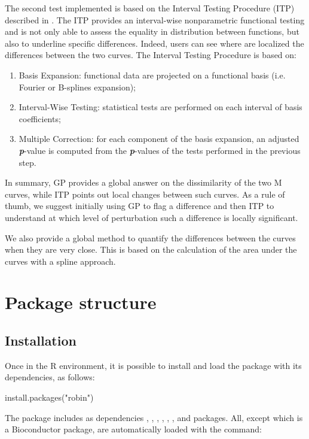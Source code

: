 The second test implemented is based on the Interval Testing Procedure (ITP) described in \cite{PiniVantini:2016}.
The ITP provides an interval-wise nonparametric functional testing and is not only able to assess the equality in distribution between functions, but also to underline specific differences. 
Indeed, users can see where are localized the differences between the two curves.
The Interval Testing Procedure is based on: 
\begin{enumerate}
\item Basis Expansion: functional data are projected on a functional basis (i.e. Fourier or B-splines expansion);
\item Interval-Wise Testing: statistical tests are performed on each interval of basis coefficients;
\item Multiple Correction: for each component of the basis expansion, an adjusted \textbf{\emph{p}}-value is computed from the \textbf{\emph{p}}-values of the tests performed in the previous step.
\end{enumerate}
In summary, GP provides a global answer on the dissimilarity of the two M curves, while ITP points out local changes between such curves. As a rule of thumb, we suggest initially using GP to flag a difference and then ITP to understand at which level of perturbation such a difference is locally significant.

We also provide a global method to quantify the differences between the curves when they are very close. This is based on the calculation of the area under the curves with a spline approach.

\section{Package structure} 	
\subsection{Installation}
Once in the R environment, it is possible to install and load the  package with its dependencies, as follows:

\begin{example}
install.packages("robin")
\end{example}

The  package includes as dependencies  \citep{Csardi:2019},   \citep{Allaire:2017},   \citep{Wickham:2019},   \citep{Auguie2017},   \citep{PiniVantini:2015} ,  \citep{KalaitzisLawrence2011}, and   \citep{Signorell2019} packages. All, except  which is a Bioconductor package, are automatically loaded with the command: 

